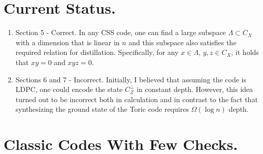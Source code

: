 \section{Current Status.}

\begin{enumerate}
  \item Section 5 - Correct. In any CSS code, one can find a large subspace
    $\Lambda \subset C_{X}$ with a dimension that is linear in $n$ and this
    subspace also satisfies the required relation for distillation.
    Specifically,
    for any $x \in \Lambda$, $y, z \in C_{X}$, it holds that $xy = 0$ and $xyz =
    0$.
  \item Sections 6 and 7 - Incorrect. Initially, I believed that assuming the
    code is LDPC, one could encode the state $C_{Z}^{\perp}$ in constant depth.
    However, this idea turned out to be incorrect both in calculation and in
    contrast to the fact that synthesizing the ground state of the Toric code
    requires $\Omega(\log n)$ depth.
\end{enumerate}

\section{Classic Codes With Few Checks.}

